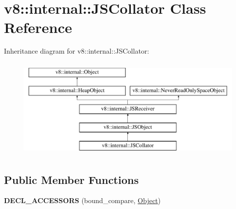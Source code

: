 \hypertarget{classv8_1_1internal_1_1JSCollator}{}\section{v8\+:\+:internal\+:\+:J\+S\+Collator Class Reference}
\label{classv8_1_1internal_1_1JSCollator}
Inheritance diagram for v8\+:\+:internal\+:\+:J\+S\+Collator\+:\begin{figure}[H]
\begin{center}
\leavevmode
\includegraphics[height=5.000000cm]{classv8_1_1internal_1_1JSCollator}
\end{center}
\end{figure}
\subsection*{Public Member Functions}
\begin{DoxyCompactItemize}
\item 
\mbox{\label{classv8_1_1internal_1_1JSCollator_a0cef3e8e67c183aeca64792067a9928f}} 
{\bfseries D\+E\+C\+L\+\_\+\+A\+C\+C\+E\+S\+S\+O\+RS} (bound\+\_\+compare, \mbox{\hyperlink{classv8_1_1internal_1_1Object}{Object}})
\end{DoxyCompactItemize}
